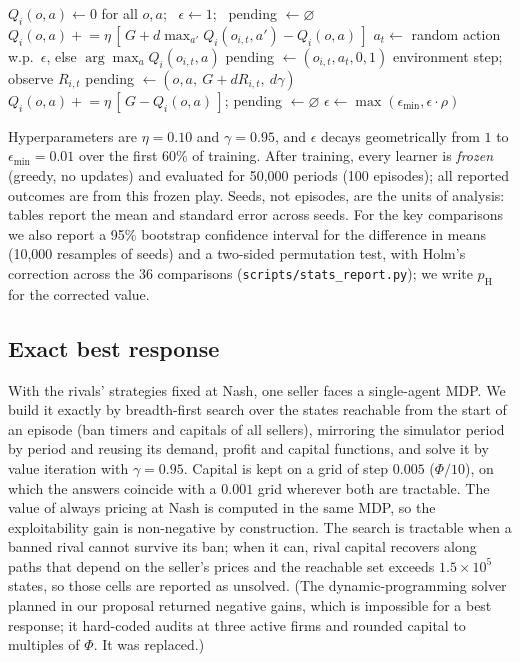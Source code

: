\documentclass{article}
\begin{document}
\begin{algorithm}[t]
\caption{Independent Q-learning with suspension-aware transitions (per seller $i$)}\label{alg:q}
\begin{algorithmic}[1]
\State $Q_i(o,a)\gets 0$ for all $o,a$; \ $\epsilon\gets 1$; \ pending $\gets\varnothing$
     $Q_i(o,a)\mathrel{+}=\eta\,[\,G+d\max_{a'}Q_i(o_{i,t},a')-Q_i(o,a)\,]$ \EndIf
    \State $a_t\gets$ random action w.p.\ $\epsilon$, else $\arg\max_a Q_i(o_{i,t},a)$ 
    \State pending $\gets(o_{i,t},a_t,0,1)$
  \EndIf
  \State environment step; observe $R_{i,t}$
   pending $\gets(o,a,\ G+dR_{i,t},\ d\gamma)$ \EndIf
   $Q_i(o,a)\mathrel{+}=\eta\,[\,G-Q_i(o,a)\,]$; pending $\gets\varnothing$ \EndIf
  \State $\epsilon\gets\max(\epsilon_{\min},\epsilon\cdot\rho)$
\EndFor
\end{algorithmic}
\end{algorithm}

Hyperparameters are $\eta=0.10$ and $\gamma=0.95$, and $\epsilon$ decays geometrically from $1$ to $\epsilon_{\min}=0.01$ over the first 60\% of training. After training, every learner is \emph{frozen} (greedy, no updates) and evaluated for 50{,}000 periods (100 episodes); all reported outcomes are from this frozen play. Seeds, not episodes, are the units of analysis: tables report the mean and standard error across seeds. For the key comparisons we also report a 95\% bootstrap confidence interval for the difference in means (10{,}000 resamples of seeds) and a two-sided permutation test, with Holm's correction across the 36 comparisons (\texttt{scripts/stats\_report.py}); we write $p_{\mathrm{H}}$ for the corrected value.

\subsection{Exact best response}
\label{sec:exact}
With the rivals' strategies fixed at Nash, one seller faces a single-agent MDP. We build it exactly by breadth-first search over the states reachable from the start of an episode (ban timers and capitals of all sellers), mirroring the simulator period by period and reusing its demand, profit and capital functions, and solve it by value iteration with $\gamma=0.95$. Capital is kept on a grid of step $0.005$ ($\Phi/10$), on which the answers coincide with a $0.001$ grid wherever both are tractable. The value of always pricing at Nash is computed in the same MDP, so the exploitability gain is non-negative by construction. The search is tractable when a banned rival cannot survive its ban; when it can, rival capital recovers along paths that depend on the seller's prices and the reachable set exceeds $1.5\times10^5$ states, so those cells are reported as unsolved. (The dynamic-programming solver planned in our proposal returned negative gains, which is impossible for a best response; it hard-coded audits at three active firms and rounded capital to multiples of $\Phi$. It was replaced.)
\end{document}
